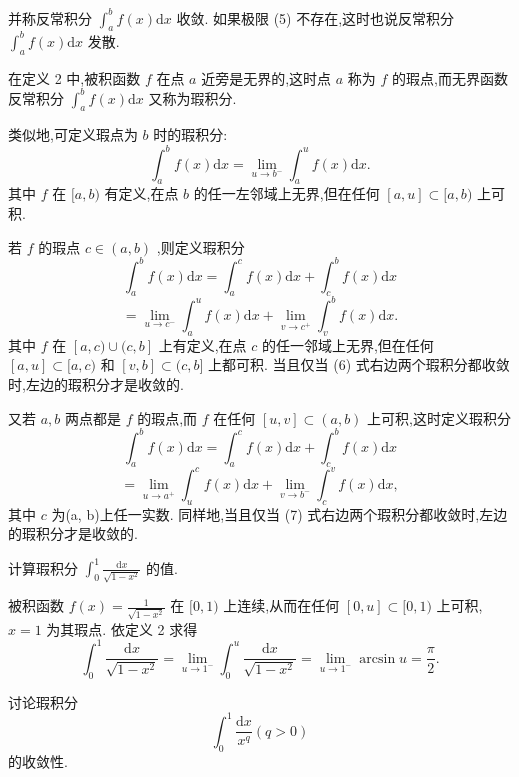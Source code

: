 并称反常积分 \({\int }_{a}^{b}f\left( x\right) \mathrm{d}x\) 收敛. 如果极限 (5) 不存在,这时也说反常积分 \({\int }_{a}^{b}f\left( x\right) \mathrm{d}x\) 发散.

在定义 2 中,被积函数 \(f\) 在点 \(a\) 近旁是无界的,这时点 \(a\) 称为 \(f\) 的瑕点,而无界函数反常积分 \({\int }_{a}^{b}f\left( x\right) \mathrm{d}x\) 又称为瑕积分.

类似地,可定义瑕点为 \(b\) 时的瑕积分:
\[
{\int }_{a}^{b}f\left( x\right) \mathrm{d}x = \mathop{\lim }\limits_{{u \rightarrow  {b}^{ - }}}{\int }_{a}^{u}f\left( x\right) \mathrm{d}x.
\]
其中 \(f\) 在 \(\lbrack a,b)\) 有定义,在点 \(b\) 的任一左邻域上无界,但在任何 \(\left\lbrack  {a,u}\right\rbrack   \subset  \lbrack a,b)\) 上可积.

若 \(f\) 的瑕点 \(c \in  \left( {a,b}\right)\) ,则定义瑕积分
\[
{\int }_{a}^{b}f\left( x\right) \mathrm{d}x = {\int }_{a}^{c}f\left( x\right) \mathrm{d}x + {\int }_{c}^{b}f\left( x\right) \mathrm{d}x
\]
\[
= \mathop{\lim }\limits_{{u \rightarrow  {c}^{ - }}}{\int }_{a}^{u}f\left( x\right) \mathrm{d}x + \mathop{\lim }\limits_{{v \rightarrow  {c}^{ + }}}{\int }_{v}^{b}f\left( x\right) \mathrm{d}x. \tag{6}
\]
其中 \(f\) 在 \(\left\lbrack  {a,c) \cup  (c,b}\right\rbrack\) 上有定义,在点 \(c\) 的任一邻域上无界,但在任何 \(\left\lbrack  {a,u}\right\rbrack   \subset  \lbrack a,c)\) 和 \(\left\lbrack  {v,b}\right\rbrack   \subset  (c,b\rbrack\) 上都可积. 当且仅当 (6) 式右边两个瑕积分都收敛时,左边的瑕积分才是收敛的.

又若 \(a,b\) 两点都是 \(f\) 的瑕点,而 \(f\) 在任何 \(\left\lbrack  {u,v}\right\rbrack   \subset  \left( {a,b}\right)\) 上可积,这时定义瑕积分
\[
{\int }_{a}^{b}f\left( x\right) \mathrm{d}x = {\int }_{a}^{c}f\left( x\right) \mathrm{d}x + {\int }_{c}^{b}f\left( x\right) \mathrm{d}x
\]
\[
= \mathop{\lim }\limits_{{u \rightarrow  {a}^{ + }}}{\int }_{u}^{c}f\left( x\right) \mathrm{d}x + \mathop{\lim }\limits_{{v \rightarrow  {b}^{ - }}}{\int }_{c}^{v}f\left( x\right) \mathrm{d}x, \tag{7}
\]
其中 \(c\) 为(a, b)上任一实数. 同样地,当且仅当 (7) 式右边两个瑕积分都收敛时,左边的瑕积分才是收敛的.

\begin{example}

\end{example}
计算瑕积分 \({\int }_{0}^{1}\frac{\mathrm{d}x}{\sqrt{1 - {x}^{2}}}\) 的值.

\begin{solution}

\end{solution}
被积函数 \(f\left( x\right)  = \frac{1}{\sqrt{1 - {x}^{2}}}\) 在 \(\lbrack 0,1)\) 上连续,从而在任何 \(\left\lbrack  {0,u}\right\rbrack   \subset  \lbrack 0,1)\) 上可积, \(x = 1\) 为其瑕点. 依定义 2 求得
\[
{\int }_{0}^{1}\frac{\mathrm{d}x}{\sqrt{1 - {x}^{2}}} = \mathop{\lim }\limits_{{u \rightarrow  {1}^{ - }}}{\int }_{0}^{u}\frac{\mathrm{d}x}{\sqrt{1 - {x}^{2}}} = \mathop{\lim }\limits_{{u \rightarrow  {1}^{ - }}}\arcsin u = \frac{\pi }{2}.
\]
\begin{example}

\end{example}
讨论瑕积分
\[
{\int }_{0}^{1}\frac{\mathrm{d}x}{{x}^{q}}\left( {q > 0}\right)  \tag{8}
\]
的收敛性.

